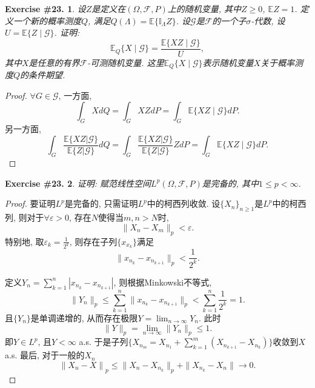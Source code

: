 \documentclass[UTF8, a4paper]{article}
\newtheorem{exercise}{Exercise \#23.}
\begin{document}
\begin{framed}
\begin{exercise}
设\(Z\)是定义在\((\Omega, \mathcal{F}, P)\)上的随机变量, 其中\(Z \geq 0\), \(\mathbb{E}Z = 1\).
定义一个新的概率测度\(Q\), 满足\(Q(\Lambda) = \mathbb{E}\{\mathbb{I}_{\Lambda} Z\}\).
设\(\mathcal{G}\)是\(\mathcal{F}\)的一个子\(\sigma\)-代数, 设\(U = \mathbb{E}\{Z\mid \mathcal{G}\}\).
证明: 
$$
\mathbb{E}_Q\{X \mid \mathcal{G}\} = \frac{\mathbb{E}\{XZ\mid \mathcal{G}\}}{U}, 
$$
其中\(X\)是任意的有界\(\mathcal{F}\)-可测随机变量.
这里\(\mathbb{E}_Q\{X\mid \mathcal{G}\}\)表示随机变量\(X\)关于概率测度\(Q\)的条件期望.
\end{exercise}
\end{framed}

\begin{proof}
    \(\forall G \in \mathcal{G}\), 
一方面, 
$$
\int_G X dQ = \int_G XZ dP = \int_G \mathbb{E}\{XZ\mid \mathcal{G}\} dP .
$$
另一方面, 
$$
\int_G \frac{\mathbb{E}\{XZ|\mathcal{G}\}}{\mathbb{E}\{Z|\mathcal{G}\}} dQ = \int_G \frac{\mathbb{E}\{XZ|\mathcal{G}\}}{\mathbb{E}\{Z|\mathcal{G}\}} Z dP = \int_G \mathbb{E}\{XZ\mid \mathcal{G}\} dP.
$$
\end{proof}




\begin{framed}
\begin{exercise}
证明: 赋范线性空间\(L^p(\Omega, \mathcal{F}, P)\)是完备的, 其中\(1\leq p < \infty\).
\end{exercise}
\end{framed}

\begin{proof}
要证明\(L^p\)是完备的, 只需证明\(L^p\)中的柯西列收敛.
设\(\{X_n\}_{n\geq 1}\)是\(L^p\)中的柯西列, 则对于\(\forall \varepsilon > 0\), 存在\(N\)使得当\(m,n > N\)时,
$$
\|X_n - X_m\|_p < \varepsilon.
$$
特别地, 取\(\varepsilon_k = \frac{1}{2^k}\), 
则存在子列\(\{x_{x_k}\}\)满足
$$
\|x_{n_k} - x_{n_{k+1}}\|_p < \frac{1}{2^k}.
$$

定义\(Y_n =\sum_{k=1}^{n} |x_{n_k} - x_{n_{k+1}}|\), 
则根据Minkowski不等式,
$$
\|Y_n\|_p \leq \sum_{k=1}^{n} \|x_{n_k} - x_{n_{k+1}}\|_p < \sum_{k=1}^{n} \frac{1}{2^k} = 1.
$$
且\(\{Y_n\}\)是单调递增的, 从而存在极限\(Y = \lim_{n\to \infty} Y_n\).
此时
$$
\|Y\|_p = \lim_{n\to \infty} \|Y_n\|_p \leq 1. 
$$
即\(Y \in L^p\), 且\(Y < \infty\) a.s.
于是子列\(\{X_{n_m} = X_{n_1} +\sum_{k=1}^{m} (X_{n_{k+1}} - X_{n_k})\}\)收敛到\(X\) a.s.
最后, 对于一般的\(X_n\)
$$
\left\|X_n-X \right\|_p \leqslant \|X_n-X_{n_k}\|_p+\| X_{n_k}-X_n \|\rightarrow 0 .
$$
\end{proof}
\end{document}
